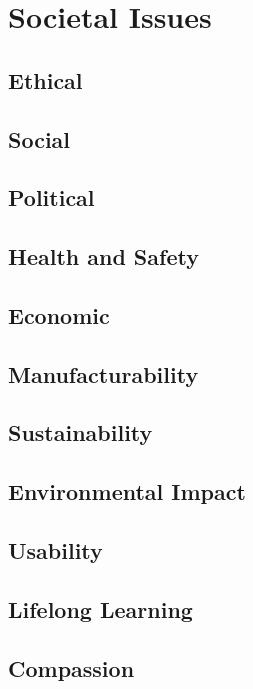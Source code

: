 \chapter{Societal Issues}

\section{Ethical}


\section{Social}


\section{Political}


\section{Health and Safety}
\section{Economic}


\section{Manufacturability}
\section{Sustainability}
\section{Environmental Impact}
\section{Usability}
\section{Lifelong Learning}
\section{Compassion}